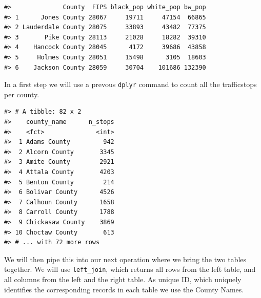 \documentclass[]{book}
\newenvironment{Shaded}{\begin{snugshade}}{\end{snugshade}}
\newcommand{\DataTypeTok}[1]{\textcolor[rgb]{0.13,0.29,0.53}{#1}}
\newcommand{\KeywordTok}[1]{\textcolor[rgb]{0.13,0.29,0.53}{\textbf{#1}}}
\newcommand{\NormalTok}[1]{#1}
\newcommand{\OperatorTok}[1]{\textcolor[rgb]{0.81,0.36,0.00}{\textbf{#1}}}
\newcommand{\StringTok}[1]{\textcolor[rgb]{0.31,0.60,0.02}{#1}}
\begin{document}
\begin{verbatim}
#>              County  FIPS black_pop white_pop bw_pop
#> 1      Jones County 28067     19711     47154  66865
#> 2 Lauderdale County 28075     33893     43482  77375
#> 3       Pike County 28113     21028     18282  39310
#> 4    Hancock County 28045      4172     39686  43858
#> 5     Holmes County 28051     15498      3105  18603
#> 6    Jackson County 28059     30704    101686 132390
\end{verbatim}

In a first step we will use a prevous \texttt{dplyr} command to count all the trafficstops per county.

\begin{Shaded}
\end{Shaded}

\begin{verbatim}
#> # A tibble: 82 x 2
#>    county_name      n_stops
#>    <fct>              <int>
#>  1 Adams County         942
#>  2 Alcorn County       3345
#>  3 Amite County        2921
#>  4 Attala County       4203
#>  5 Benton County        214
#>  6 Bolivar County      4526
#>  7 Calhoun County      1658
#>  8 Carroll County      1788
#>  9 Chickasaw County    3869
#> 10 Choctaw County       613
#> # ... with 72 more rows
\end{verbatim}

We will then pipe this into our next operation where we bring the two tables together. We will use \texttt{left\_join}, which returns all rows from the left table, and all columns from the left and the right table. As unique ID, which uniquely identifies the corresponding records in each table we use the County Names.

\begin{Shaded}
\end{Shaded}
\end{document}
